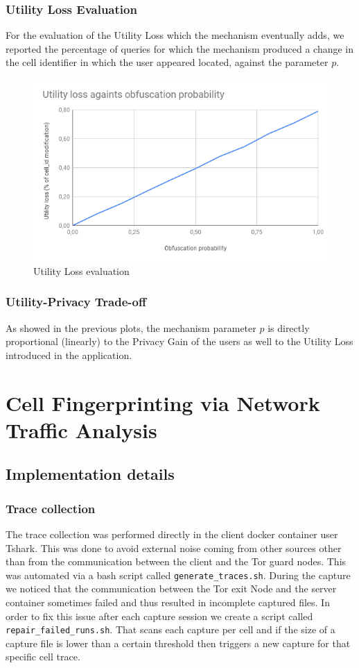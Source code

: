 \documentclass[10pt,conference,compsocconf]{IEEEtran}
\begin{document}
\subsubsection{Utility Loss Evaluation}
For the evaluation of the Utility Loss which the mechanism eventually adds, we
reported the percentage of queries for which the mechanism produced a change in
the cell identifier in which the user appeared located, against the parameter
$p$.
\begin{figure}[h!]
    \centering
    \includegraphics[width=0.5\linewidth]{../privacy_evaluation/defence_evaluation/utility_loss.png}
    \caption{Utility Loss evaluation}
\end{figure}
\subsubsection{Utility-Privacy Trade-off}
As showed in the previous plots, the mechanism parameter $p$ is directly
proportional (linearly) to the Privacy Gain of the users as well to the Utility
Loss introduced in the application.
\section{Cell Fingerprinting via Network Traffic Analysis}

\subsection{Implementation details}

\subsubsection{Trace collection}
The trace collection was performed directly in the client docker container user Tshark.
This was done to avoid external noise coming from other sources other than from the communication between the client and the Tor guard nodes.
This was automated via a bash script called \texttt{generate\_traces.sh}. During the capture we noticed that the communication between
the Tor exit Node and the server container sometimes failed and thus resulted in incomplete captured files. In order to fix this issue
after each capture session we create a script called \texttt{repair\_failed\_runs.sh}. That scans each capture per cell and if the size of a capture file 
is lower than a certain threshold then triggers a new capture for that specific cell trace.
\end{document}
